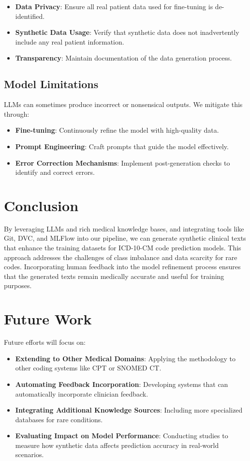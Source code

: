 \documentclass[12pt, a4paper]{article}
\begin{document}
\begin{itemize}
    \item \textbf{Data Privacy}: Ensure all real patient data used for fine-tuning is de-identified.
    \item \textbf{Synthetic Data Usage}: Verify that synthetic data does not inadvertently include any real patient information.
    \item \textbf{Transparency}: Maintain documentation of the data generation process.
\end{itemize}

\subsection{Model Limitations}

LLMs can sometimes produce incorrect or nonsensical outputs. We mitigate this through:

\begin{itemize}
    \item \textbf{Fine-tuning}: Continuously refine the model with high-quality data.
    \item \textbf{Prompt Engineering}: Craft prompts that guide the model effectively.
    \item \textbf{Error Correction Mechanisms}: Implement post-generation checks to identify and correct errors.
\end{itemize}

\section{Conclusion}

By leveraging LLMs and rich medical knowledge bases, and integrating tools like Git, DVC, and MLFlow into our pipeline, we can generate synthetic clinical texts that enhance the training datasets for ICD-10-CM code prediction models. This approach addresses the challenges of class imbalance and data scarcity for rare codes. Incorporating human feedback into the model refinement process ensures that the generated texts remain medically accurate and useful for training purposes.

\section{Future Work}

Future efforts will focus on:

\begin{itemize}
    \item \textbf{Extending to Other Medical Domains}: Applying the methodology to other coding systems like CPT or SNOMED CT.
    \item \textbf{Automating Feedback Incorporation}: Developing systems that can automatically incorporate clinician feedback.
    \item \textbf{Integrating Additional Knowledge Sources}: Including more specialized databases for rare conditions.
    \item \textbf{Evaluating Impact on Model Performance}: Conducting studies to measure how synthetic data affects prediction accuracy in real-world scenarios.
\end{itemize}
\end{document}
